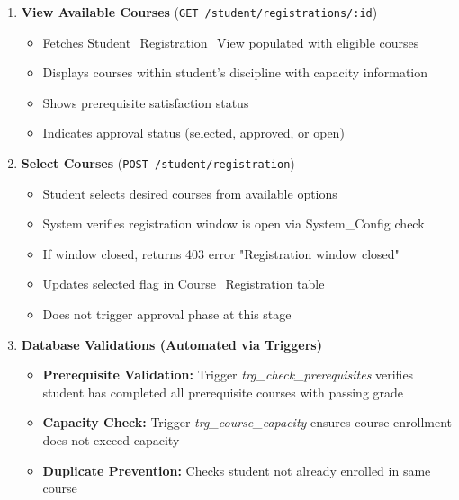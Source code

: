 \documentclass[12pt]{article}
\begin{document}
\begin{enumerate}
    \item \textbf{View Available Courses} (\texttt{GET /student/registrations/:id})
        \begin{itemize}
            \item Fetches Student\_Registration\_View populated with eligible courses
            \item Displays courses within student's discipline with capacity information
            \item Shows prerequisite satisfaction status
            \item Indicates approval status (selected, approved, or open)
        \end{itemize}
    
    \item \textbf{Select Courses} (\texttt{POST /student/registration})
        \begin{itemize}
            \item Student selects desired courses from available options
            \item System verifies registration window is open via System\_Config check
            \item If window closed, returns 403 error "Registration window closed"
            \item Updates selected flag in Course\_Registration table
            \item Does not trigger approval phase at this stage
        \end{itemize}
    
    \item \textbf{Database Validations (Automated via Triggers)}
        \begin{itemize}
            \item \textbf{Prerequisite Validation:} Trigger \textit{trg\_check\_prerequisites} verifies student has completed all prerequisite courses with passing grade
            \item \textbf{Capacity Check:} Trigger \textit{trg\_course\_capacity} ensures course enrollment does not exceed capacity
            \item \textbf{Duplicate Prevention:} Checks student not already enrolled in same course
        \end{itemize}
    

\end{enumerate}
\end{document}
